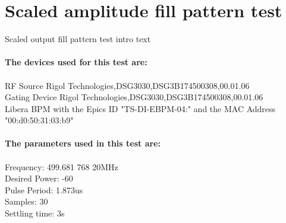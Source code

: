 \documentclass[a4paper, 11pt]{article}%
\begin{document}
\section{Scaled amplitude fill pattern test}%
Scaled output fill pattern test intro text\\\\%
\textbf{The devices used for this test are:}\\\\%
RF Source Rigol Technologies,DSG3030,DSG3B174500308,00.01.06\\%
Gating Device Rigol Technologies,DSG3030,DSG3B174500308,00.01.06\\%
Libera BPM with the Epics ID "TS-DI-EBPM-04:" and the MAC Address "00:d0:50:31:03:b9"\\%
\\%
\textbf{The parameters used in this test are:}\\\\%
Frequency: 499.681 768 20MHz\\%
Desired Power: -60\\%
Pulse Period: 1.873us\\%
Samples: 30\\%
Settling time: 3s\\
\end{document}
